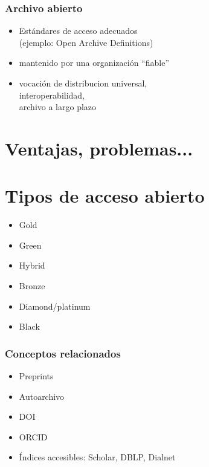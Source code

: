 \documentclass[17pt,aspectratio=169]{beamer}
\begin{document}

\begin{frame}
\frametitle{Archivo abierto}

\begin{itemize}
\item Estándares de acceso adecuados \\
  (ejemplo: Open Archive Definitions)
\item mantenido por una organización ``fiable''
\item vocación de distribucion universal, \\
  interoperabilidad, \\
  archivo a largo plazo
\end{itemize}

\end{frame}

\section{Ventajas, problemas...}


\section{Tipos de acceso abierto}

\begin{frame}

\begin{itemize}
\item Gold
\item Green
\item Hybrid
\item Bronze
\item Diamond/platinum
\item Black
\end{itemize}

\end{frame}


\begin{frame}
\frametitle{Conceptos relacionados}

\begin{itemize}
\item Preprints
\item Autoarchivo
\item DOI
\item ORCID
\item Índices accesibles: Scholar, DBLP, Dialnet
\end{itemize}

\end{frame}
\end{document}
